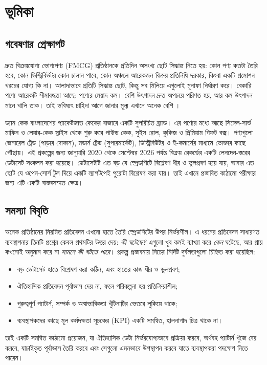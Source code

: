 \chapter{ভূমিকা}\label{ch:intro}

\section{গবেষণার প্রেক্ষাপট}
দ্রুত বিক্রয়যোগ্য ভোগ্যপণ্য (FMCG) প্রতিষ্ঠানকে প্রতিদিন অসংখ্য ছোট সিদ্ধান্ত নিতে হয়: কোন পণ্য কতটা তৈরি হবে, কোন
ডিস্ট্রিবিউটর কোন চালান পাবে, কোন অঞ্চলে আরেকজন বিক্রয় প্রতিনিধি দরকার, কিংবা একটি প্রমোশন খরচের যোগ্য কি না। আলাদাভাবে
প্রতিটি সিদ্ধান্ত ছোট, কিন্তু সব মিলিয়ে এগুলোই মুনাফা নির্ধারণ করে। বেকারি পণ্যে আরেকটি সীমাবদ্ধতা আছে: পণ্যের মেয়াদ কম।
বেশি উৎপাদন দ্রুত অপচয়ে পরিণত হয়, আর কম উৎপাদন মানে খালি তাক। তাই ভবিষ্যৎ চাহিদা আগে জানার মূল্য এখানে অনেক বেশি
\citep{hyndman2021}।

ড্যান কেক বাংলাদেশের প্যাকেটজাত কেকের বাজারে একটি সুপরিচিত ব্র্যান্ড। এর পণ্যের মধ্যে আছে সিঙ্গেল-সার্ভ মাফিন ও লেয়ার-কেক
স্লাইস থেকে শুরু করে পাউন্ড কেক, সুইস রোল, কুকিজ ও প্রিমিয়াম গিফট বক্স। পণ্যগুলো জেনারেল ট্রেড (পাড়ার দোকান), মডার্ন ট্রেড
(সুপারমার্কেট), ডিস্ট্রিবিউটর ও ই-কমার্সের মাধ্যমে ভোক্তার কাছে পৌঁছায়। এই প্রকল্পের জন্য জানুয়ারি 2020 থেকে সেপ্টেম্বর 2026
পর্যন্ত \NRows বিক্রয় রেকর্ডের একটি লেনদেন-স্তরের ডেটাসেট সংকলন করা হয়েছে। ডেটাসেটটি এত বড় যে স্প্রেডশিটে বিশ্লেষণ ধীর
ও ভুলপ্রবণ হয়ে যায়, আবার এত ছোট যে ওপেন-সোর্স টুল দিয়ে একটি ল্যাপটপেই পুরোটা বিশ্লেষণ করা যায়। তাই এখানে প্রস্তাবিত
কাঠামো পরীক্ষার জন্য এটি একটি বাস্তবসম্মত ক্ষেত্র।

\section{সমস্যা বিবৃতি}
অনেক প্রতিষ্ঠানের নিয়মিত প্রতিবেদন এখনো হাতে তৈরি স্প্রেডশিটের উপর নির্ভরশীল। এ ধরনের প্রতিবেদন সাধারণত ব্যবস্থাপনার তিনটি
প্রশ্নের কেবল প্রথমটির উত্তর দেয়: \emph{কী ঘটেছে?} এগুলো খুব কমই ব্যাখ্যা করে \emph{কেন} ঘটেছে, আর প্রায় কখনোই অনুমান করে না
\emph{সামনে কী ঘটতে পারে}। প্রকল্প প্রস্তাবনায় নিচের নির্দিষ্ট দুর্বলতাগুলো চিহ্নিত করা হয়েছিল:
\begin{itemize}
  \item বড় ডেটাসেট হাতে বিশ্লেষণ করা কঠিন, এবং হাতের কাজ ধীর ও ভুলপ্রবণ;
  \item ঐতিহাসিক প্রতিবেদন পূর্বাভাস দেয় না, ফলে পরিকল্পনা হয় প্রতিক্রিয়াশীল;
  \item গুরুত্বপূর্ণ প্যাটার্ন, সম্পর্ক ও অস্বাভাবিকতা খুঁটিনাটির ভেতরে লুকিয়ে থাকে;
  \item ব্যবস্থাপকদের কাছে মূল কর্মদক্ষতা সূচকের (KPI) একটি সমন্বিত, হালনাগাদ চিত্র থাকে না।
\end{itemize}
তাই একটি সমন্বিত কাঠামো প্রয়োজন, যা ঐতিহাসিক ডেটা নির্ভরযোগ্যভাবে প্রক্রিয়া করবে, অর্থবহ প্যাটার্ন খুঁজে বের করবে, যাচাইকৃত
পূর্বাভাস তৈরি করবে এবং সেগুলো এমনভাবে উপস্থাপন করবে যাতে ব্যবস্থাপকরা পদক্ষেপ নিতে পারেন।

